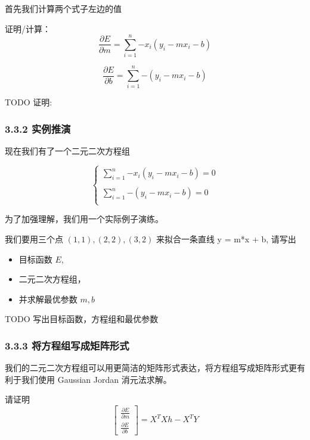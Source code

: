 \documentclass[11pt]{article}
\providecommand{\tightlist}{%
      \setlength{\itemsep}{0pt}\setlength{\parskip}{0pt}}
\begin{document}
首先我们计算两个式子左边的值

证明/计算： \[
\frac{\partial E}{\partial m} = \sum_{i=1}^{n}{-x_i(y_i - mx_i - b)}
\]

\[
\frac{\partial E}{\partial b} = \sum_{i=1}^{n}{-(y_i - mx_i - b)}
\]

    TODO 证明:

    \subsubsection{3.3.2 实例推演}\label{ux5b9eux4f8bux63a8ux6f14}

现在我们有了一个二元二次方程组

\[
\begin{cases}
\displaystyle
\sum_{i=1}^{n}{-x_i(y_i - mx_i - b)} =0 \\
\\
\displaystyle
\sum_{i=1}^{n}{-(y_i - mx_i - b)} =0 \\
\end{cases}
\]

为了加强理解，我们用一个实际例子演练。

我们要用三个点 \((1,1), (2,2), (3,2)\) 来拟合一条直线 y = m*x + b,
请写出

\begin{itemize}
\tightlist
\item
  目标函数 \(E\),
\item
  二元二次方程组，
\item
  并求解最优参数 \(m, b\)
\end{itemize}

    TODO 写出目标函数，方程组和最优参数

    \subsubsection{3.3.3
将方程组写成矩阵形式}\label{ux5c06ux65b9ux7a0bux7ec4ux5199ux6210ux77e9ux9635ux5f62ux5f0f}

我们的二元二次方程组可以用更简洁的矩阵形式表达，将方程组写成矩阵形式更有利于我们使用
Gaussian Jordan 消元法求解。

请证明 \[
\begin{bmatrix}
    \frac{\partial E}{\partial m} \\
    \frac{\partial E}{\partial b} 
\end{bmatrix} = X^TXh - X^TY
\]
\end{document}
